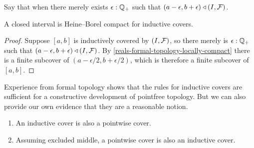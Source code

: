 Say that  when there merely exists $\epsilon : \mathbb{Q}_{+}$ such that $(a - \epsilon, b +
\epsilon) \triangleleft {\mathopen{}(I, \mathcal{F})\mathclose{}}$.

\begin{cor} \label{interval-Heine-Borel}
  A closed interval is Heine--Borel compact for inductive covers.
\end{cor}

\begin{proof}
  Suppose $[a, b]$ is inductively covered by ${\mathopen{}(I, \mathcal{F})\mathclose{}}$, so there merely is
  $\epsilon : \mathbb{Q}_{+}$ such that $(a - \epsilon, b + \epsilon) \triangleleft {\mathopen{}(I, \mathcal{F})\mathclose{}}$.
  By \cref{reals-formal-topology-locally-compact} there is a finite subcover of
  $(a - \epsilon/2, b + \epsilon/2)$, which is therefore a finite subcover of $[a, b]$.
\end{proof}

Experience from formal topology shows that the rules for inductive covers are sufficient
for a constructive development of pointfree topology. But we can also provide our own
evidence that they are a reasonable notion.

\begin{thm} \label{inductive-cover-classical}
  \mbox{}
  \begin{enumerate}
  \item An inductive cover is also a pointwise cover.
  \item Assuming excluded middle, a pointwise cover is also an inductive cover.
  \end{enumerate}
\end{thm}

